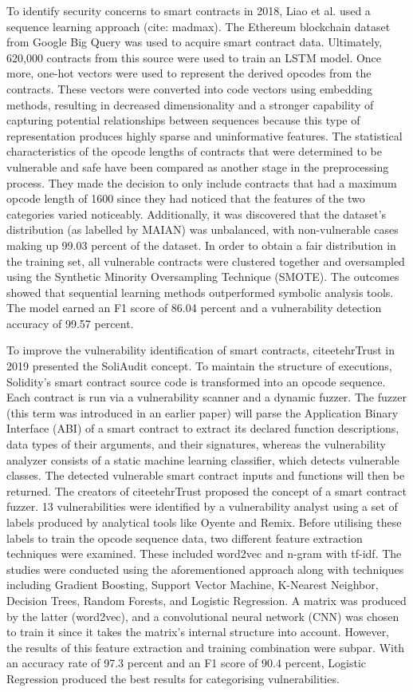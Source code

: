 To identify security concerns to smart contracts in 2018, Liao et al. used a sequence learning approach (cite: madmax).
The Ethereum blockchain dataset from Google Big Query was used to acquire smart contract data.
Ultimately, 620,000 contracts from this source were used to train an LSTM model. Once more, one-hot vectors were used to represent the derived opcodes from the contracts.
These vectors were converted into code vectors using embedding methods, resulting in decreased dimensionality and a stronger capability of capturing potential relationships between sequences because this type of representation produces highly sparse and uninformative features.
The statistical characteristics of the opcode lengths of contracts that were determined to be vulnerable and safe have been compared as another stage in the preprocessing process.
They made the decision to only include contracts that had a maximum opcode length of 1600 since they had noticed that the features of the two categories varied noticeably.
Additionally, it was discovered that the dataset's distribution (as labelled by MAIAN) was unbalanced, with non-vulnerable cases making up 99.03 percent of the dataset.
In order to obtain a fair distribution in the training set, all vulnerable contracts were clustered together and oversampled using the Synthetic Minority Oversampling Technique (SMOTE).
The outcomes showed that sequential learning methods outperformed symbolic analysis tools.
The model earned an F1 score of 86.04 percent and a vulnerability detection accuracy of 99.57 percent.

To improve the vulnerability identification of smart contracts, citeetehrTrust in 2019 presented the SoliAudit concept.
To maintain the structure of executions, Solidity's smart contract source code is transformed into an opcode sequence.
Each contract is run via a vulnerability scanner and a dynamic fuzzer.
The fuzzer (this term was introduced in an earlier paper) will parse the Application Binary Interface (ABI) of a smart contract to extract its declared function descriptions, data types of their arguments, and their signatures, whereas the vulnerability analyzer consists of a static machine learning classifier, which detects vulnerable classes.
The detected vulnerable smart contract inputs and functions will then be returned.
The creators of citeetehrTrust proposed the concept of a smart contract fuzzer.
13 vulnerabilities were identified by a vulnerability analyst using a set of labels produced by analytical tools like Oyente and Remix.
Before utilising these labels to train the opcode sequence data, two different feature extraction techniques were examined. These included word2vec and n-gram with tf-idf.
The studies were conducted using the aforementioned approach along with techniques including Gradient Boosting, Support Vector Machine, K-Nearest Neighbor, Decision Trees, Random Forests, and Logistic Regression.
A matrix was produced by the latter (word2vec), and a convolutional neural network (CNN) was chosen to train it since it takes the matrix's internal structure into account.
However, the results of this feature extraction and training combination were subpar.
With an accuracy rate of 97.3 percent and an F1 score of 90.4 percent, Logistic Regression produced the best results for categorising vulnerabilities.

